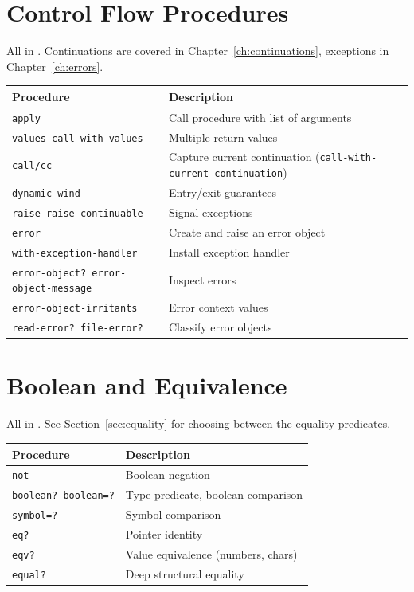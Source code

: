 \section{Control Flow Procedures}

All in . Continuations are covered in Chapter~\ref{ch:continuations}, exceptions in Chapter~\ref{ch:errors}.

\begin{center}
\small
\begin{tabularx}{\textwidth}{@{}lY@{}}
\textbf{Procedure} & \textbf{Description} \\
\hline
\texttt{apply} & Call procedure with list of arguments \\
\texttt{values call-with-values} & Multiple return values \\
\texttt{call/cc} & Capture current continuation (\texttt{call-with-\allowbreak current-\allowbreak continuation}) \\
\texttt{dynamic-wind} & Entry/exit guarantees \\
\texttt{raise raise-continuable} & Signal exceptions \\
\texttt{error} & Create and raise an error object \\
\texttt{with-exception-handler} & Install exception handler \\
\texttt{error-object? error-object-message} & Inspect errors \\
\texttt{error-object-irritants} & Error context values \\
\texttt{read-error? file-error?} & Classify error objects \\
\end{tabularx}
\end{center}

\section{Boolean and Equivalence}

All in . See Section~\ref{sec:equality} for choosing between the equality predicates.

\begin{center}
\small
\begin{tabularx}{\textwidth}{@{}lY@{}}
\textbf{Procedure} & \textbf{Description} \\
\hline
\texttt{not} & Boolean negation \\
\texttt{boolean? boolean=?} & Type predicate, boolean comparison \\
\texttt{symbol=?} & Symbol comparison \\
\texttt{eq?} & Pointer identity \\
\texttt{eqv?} & Value equivalence (numbers, chars) \\
\texttt{equal?} & Deep structural equality \\
\end{tabularx}
\end{center}

